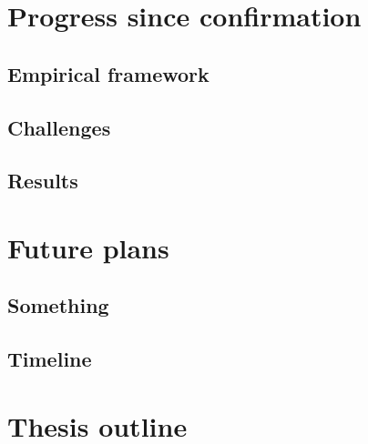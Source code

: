 \documentclass[11pt]{report}
\begin{document}
\chapter{Progress since confirmation}
\section{Empirical framework}
\section{Challenges}
\section{Results}
\chapter{Future plans}
\section{Something}
\section{Timeline}
\chapter{Thesis outline}



\end{document}

